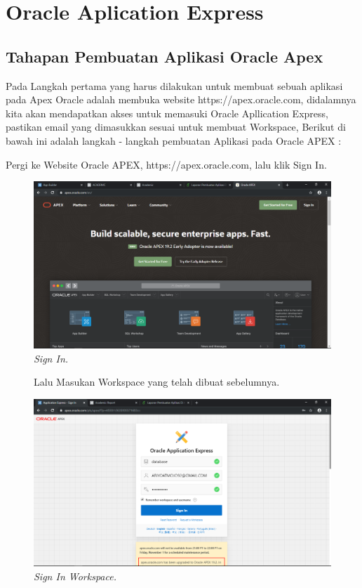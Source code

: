 \chapter{Oracle Aplication Express}

\section{Tahapan Pembuatan Aplikasi Oracle Apex}
Pada Langkah pertama yang harus dilakukan untuk membuat sebuah aplikasi pada Apex Oracle adalah membuka website https://apex.oracle.com, didalamnya kita akan mendapatkan akses untuk memasuki Oracle Apllication Express, pastikan email yang dimasukkan sesuai untuk membuat Workspace, Berikut di bawah ini adalah langkah - langkah pembuatan Aplikasi pada Oracle APEX :

\begin{enumerate}
\item[1]Pergi ke Website Oracle APEX, https://apex.oracle.com, lalu klik Sign In.

\begin{figure}[!htbp]
    \begin{center}
    \includegraphics[scale=0.2]{figures/13.png}
    \caption{\textit{Sign In.}}
    \end{center}   
    \end{figure}
    
\begin{figure}[!htbp]
\item[2]Lalu Masukan Workspace yang telah dibuat sebelumnya.

    \begin{center}
    \includegraphics[scale=0.2]{figures/1.png}
    \caption{\textit{Sign In Workspace.}}
    \end{center}



\end{figure}
\end{enumerate}

